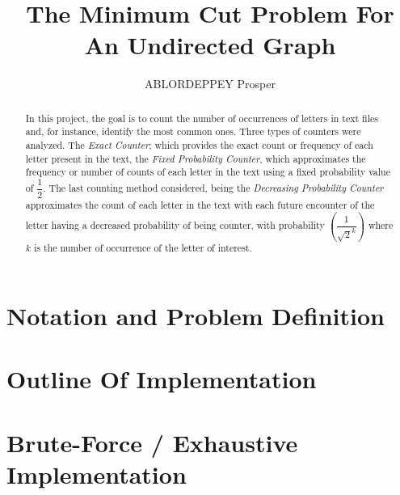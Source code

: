 \documentclass[longpaper, english, final, times]{revdetua}
\begin{document}
	
	
	\title{The Minimum Cut Problem For An Undirected Graph}
	\author{ABLORDEPPEY Prosper} %
	\maketitle
	
	\begin{abstract}%
		In this project, the goal is to count the number of occurrences of letters in text files and, for instance, identify the most common ones. Three types of counters were analyzed. The \textit{Exact Counter}; which provides the exact count or frequency of each letter present in the text, the \textit{Fixed Probability Counter}, which approximates the frequency or number of counts of each letter in the text using a fixed probability value of $\dfrac{1}{2}$. The last counting method considered, being the \textit{Decreasing Probability Counter} approximates the count of each letter in the text with each future encounter of the letter having a decreased probability of being counter, with probability $(\dfrac{1}{\sqrt{2}^k})$ where $k$ is the number of occurrence of the letter of interest.
	\end{abstract}
	
	
	

	\section{Notation and Problem Definition}
		
			
	\section{Outline Of Implementation}
		
	 	
	 \section{Brute-Force / Exhaustive Implementation}
		
\end{document}
